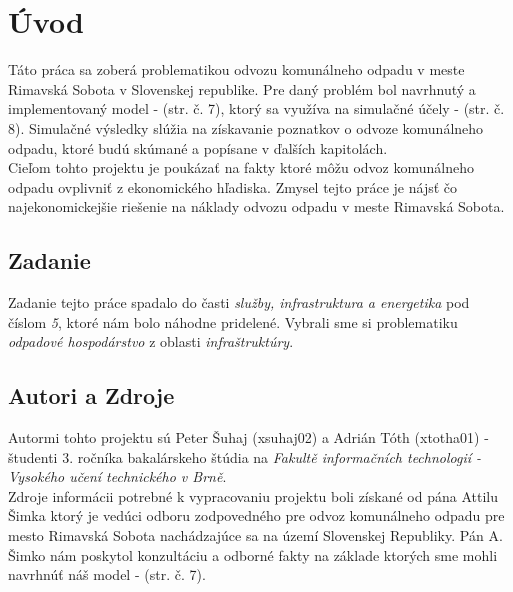 \documentclass[11pt,a4paper]{article}
\begin{document}

\setlength{\parskip}{0pt}
\hypersetup{hidelinks}\tableofcontents
\setlength{\parskip}{0pt}

\newpage %

\section{Úvod}

    \indent Táto práca sa zoberá problematikou odvozu komunálneho odpadu v meste Rimavská Sobota v Slovenskej republike. Pre daný problém bol navrhnutý a implementovaný model - \cite{IMS}(str. č. 7), ktorý sa využíva na simulačné účely - \cite{IMS}(str. č. 8). Simulačné výsledky slúžia na získavanie poznatkov o odvoze komunálneho odpadu, ktoré budú skúmané a popísane v ďalších kapitolách.\\[0.4em]
    \indent Cieľom tohto projektu je poukázať na fakty ktoré môžu odvoz komunálneho odpadu ovplivniť z ekonomického hľadiska. Zmysel tejto práce je nájsť čo najekonomickejšie riešenie na náklady odvozu odpadu v meste Rimavská Sobota.

    \subsection{Zadanie}

        \indent Zadanie tejto práce spadalo do časti \textit{služby, infrastruktura a energetika}\cite{IMS-TEMA} pod číslom \textit{5}, ktoré nám bolo náhodne pridelené. Vybrali sme si problematiku \textit{odpadové hospodárstvo} z oblasti \textit{infraštruktúry}.

    \subsection{Autori a Zdroje}

        \indent Autormi tohto projektu sú Peter Šuhaj (xsuhaj02) a Adrián Tóth (xtotha01) - študenti 3. ročníka bakalárskeho štúdia na \textit{Fakultě informačních technologií - Vysokého učení technického v Brně}\cite{VUT-FIT}.\\[0.4em]
        \indent Zdroje informácii potrebné k vypracovaniu projektu boli získané od pána Attilu Šimka ktorý je vedúci odboru zodpovedného pre odvoz komunálneho odpadu pre mesto Rimavská Sobota nachádzajúce sa na území Slovenskej Republiky. Pán A. Šimko nám poskytol konzultáciu a odborné fakty na základe ktorých sme mohli navrhnúť náš model - \cite{IMS}(str. č. 7).
\end{document}
